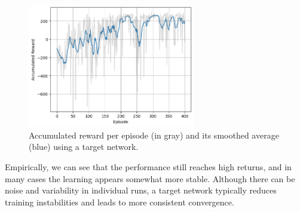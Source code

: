 \begin{figure}[H]
  \centering
  \includegraphics[width=0.65\textwidth]{Code/outputTargetQN.png}
  \caption{Accumulated reward per episode (in gray) and its smoothed average (blue) using a target network.}
\end{figure}

Empirically, we can see that the performance still reaches high returns, and in many cases the learning appears somewhat more stable. Although there can be noise and variability in individual runs, a target network typically reduces training instabilities and leads to more consistent convergence.